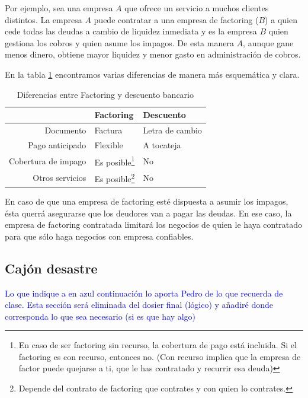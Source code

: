 \documentclass[nochap,palatino,shortheader]{apuntes}
\begin{document}
Por ejemplo, sea una empresa $A$ que ofrece un servicio a muchos clientes distintos. La empresa $A$ puede contratar a una empresa de factoring ($B$) a quien cede todas las deudas a cambio de liquidez inmediata y es la empresa $B$ quien gestiona los cobros y quien asume los impagos. De esta manera $A$, aunque gane menos dinero,  obtiene mayor liquidez y menor gasto en administración de cobros.


En la tabla \ref{tab:FactoringVsDescuento} encontramos varias diferencias de manera más esquemática y clara.

\begin{table}[hbtp]
\centering
\begin{tabular}{|r||l|l|}
\hline
&\textbf{Factoring} &\textbf{Descuento} \\
\hline\hline
Documento & Factura & Letra de cambio\\
Pago anticipado & Flexible & A tocateja\\
Cobertura de impago & Es posible\footnote{En caso de ser factoring sin recurso, la cobertura de pago está incluida. Si el factoring es con recurso, entonces no. (Con recurso implica que la empresa de factor puede quejarse a ti, que le has contratado y recurrir esa deuda)} & No\\
Otros servicios & Es posible\footnote{Depende del contrato de factoring que contrates y con quien lo contrates.} & No\\
\hline
\end{tabular}
\label{tab:FactoringVsDescuento}
\caption{Diferencias entre Factoring y descuento bancario}
\end{table}

\obs En caso de que una empresa de factoring esté dispuesta a asumir los impagos, ésta querrá asegurarse que los deudores van a pagar las deudas.
En ese caso, la empresa de factoring contratada limitará los negocios de quien le haya contratado para que sólo haga negocios con empresa confiables.


\subsection{Cajón desastre}

\textcolor{blue}{Lo que indique a en azul continuación lo aporta Pedro de lo que recuerda de clase. Esta sección será eliminada del dosier final (lógico) y añadiré donde corresponda lo que sea necesario (si es que hay algo)}
\end{document}
